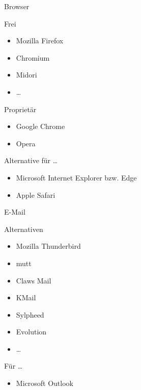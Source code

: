 \documentclass{beamer}
\begin{document}
\begin{frame}{Browser}
    {
    }
    {
        \begin{block}{Frei}
            \begin{itemize}
                \item Mozilla Firefox
                \item Chromium
                \item Midori
                \item …
            \end{itemize}
        \end{block}
        \begin{block}{Proprietär}
            \begin{itemize}
                \item Google Chrome
                \item Opera
            \end{itemize}
        \end{block}
        \begin{block}{Alternative für …}
            \begin{itemize}
                \item Microsoft Internet Explorer bzw. Edge
                \item Apple Safari
            \end{itemize}
        \end{block}
    }
\end{frame}

\begin{frame}{E-Mail}
    {
    }
    {
        \begin{block}{Alternativen}
            \begin{itemize}
                \item Mozilla Thunderbird
                \item mutt
                \item Claws Mail
                \item KMail
                \item Sylpheed
                \item Evolution
                \item …
            \end{itemize}
        \end{block}
        \begin{block}{Für …}
            \begin{itemize}
                \item Microsoft Outlook
            \end{itemize}
        \end{block}
    }
\end{frame}
\end{document}
